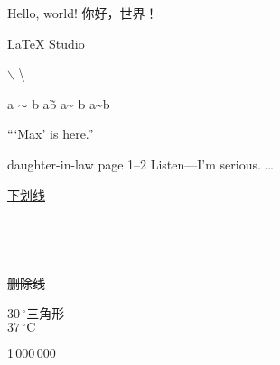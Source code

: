 \documentclass[a4paper]{ctexart}
\begin{document}
	Hello, world!
	你好，世界！

	\LaTeX{} Studio

	$\backslash$ \textbackslash \texttt{}

	a $\sim$ b
	a\~ b
	a\~{} b
	a\textasciitilde b

	``\thinspace `Max' is here.''

	daughter-in-law
	page 1--2
	Listen---I'm serious.
	\ldots %

	\uline{下划线} \\
	 \\
	 \\
	 \\
	 \\
	\sout{删除线} \\

	$30\,^{\circ}$三角形 \\
	$37\,^{\circ}\mathrm{C}$

	\mbox{1\,000\,000} %
\end{document}
